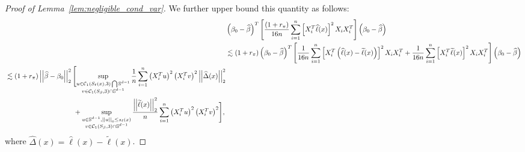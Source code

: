 \documentclass[ejsv2,noshowframe]{imsart}
\theoremstyle{plain}
\theoremstyle{definition}
\theoremstyle{remark}
\newcommand{\norm}[1]{\left|\left| #1 \right|\right|}
\renewcommand{\hat}{\widehat}
\renewcommand{\tilde}{\widetilde}
\begin{document}
\begin{proof}[Proof of Lemma~\ref{lem:negligible_cond_var}]
	We further upper bound this quantity as follows:
	\begin{align}
		\label{neg_varII}
		&\left(\beta_0 - \hat{\beta}\right)^T \left[\frac{(1+r_{\pi})}{16n}\sum_{i=1}^n \left[X_i^T \hat{\ell}(x)\right]^2 X_iX_i^T \right] \left(\beta_0 - \hat{\beta}\right) \nonumber\\
		&\lesssim (1+r_{\pi}) \left(\beta_0 - \hat{\beta}\right)^T \left[\frac{1}{16n}\sum_{i=1}^n \left[X_i^T \left(\hat{\ell}(x) - \tilde{\ell}(x)\right)\right]^2 X_iX_i^T + \frac{1}{16n}\sum_{i=1}^n \left[X_i^T \tilde{\ell}(x)\right]^2 X_iX_i^T \right] \left(\beta_0 - \hat{\beta}\right) \nonumber\\
		\begin{split}
			&\lesssim (1+r_{\pi}) \norm{\hat{\beta}-\beta_0}_2^2 \Biggl[\sup_{\substack{u\in \mathcal{C}_1\left(S_{\ell}(x), 3 \right) \bigcap \mathbb{S}^{d-1} \\v\in \mathcal{C}_1(S_{\beta},3) \cap \mathbb{S}^{d-1}}} \frac{1}{n}\sum_{i=1}^n \left(X_i^Tu\right)^2 \left(X_i^T v\right)^2 \norm{\hat{\Delta}(x)}_2^2\\
			&\hspace{35mm} + \sup_{\substack{u\in \mathbb{S}^{d-1},\norm{u}_0\leq s_{\ell}(x)\\v\in \mathcal{C}_1(S_{\beta},3) \cap \mathbb{S}^{d-1}}} \frac{\norm{\tilde{\ell}(x)}_2^2}{n}\sum_{i=1}^n \left(X_i^Tu\right)^2 \left(X_i^T v\right)^2\Biggr],
		\end{split}
	\end{align}
	where $\hat{\Delta}(x) = \hat{\ell}(x) -\tilde{\ell}(x)$. 

\end{proof}
\end{document}
